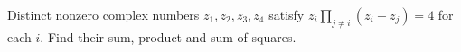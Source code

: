 Distinct nonzero complex numbers $z_1,z_2,z_3,z_4$ satisfy $z_i\prod_{j\ne i}(z_i-z_j)=4$ for each $i$. Find their sum, product and sum of squares.
